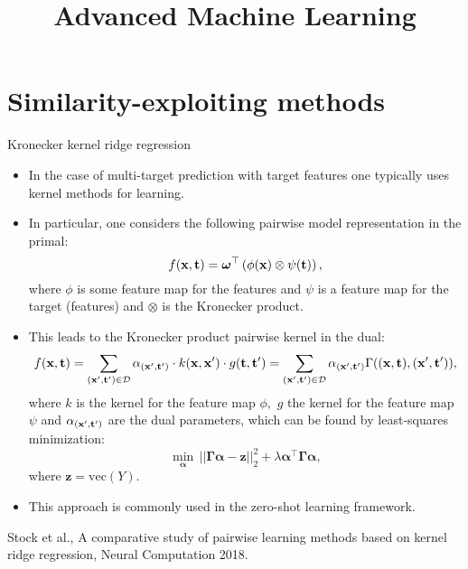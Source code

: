 \documentclass[11pt,compress,t,notes=noshow, xcolor=table]{beamer}
\title{Advanced Machine Learning}
\date{}
\newcommand{\tv}{\mathbf{t}}
\begin{document}



\sloppy

\section{Similarity-exploiting methods}


\begin{frame}{Kronecker kernel ridge regression}
	\footnotesize
	\begin{itemize}
%		
	\item In the case of multi-target prediction with target features one typically uses kernel methods for learning.
%		
	\item In particular, one considers the following pairwise model representation in the primal: 
		\begin{equation*}
			\label{eq:pairwise}
			f(\xv,\tv) = \bm\omega^\top \left(\phi(\xv) \otimes \psi(\tv) \right) ,
		\end{equation*}
%	
	where $\phi$ is some feature map for the features and $\psi$ is a feature map for the target (features) and $\otimes$ is the Kronecker product.
%
	\item This leads to the Kronecker product pairwise kernel in the dual:
%	
	\begin{eqnarray*} 
		f(\xv,\tv)= \sum_{(\xv',\tv') \in \D} \alpha_{(\xv',\tv')}  \cdot  k(\xv,\xv') \cdot g(\tv,\tv')  = \sum_{(\xv',\tv') \in \D} \alpha_{(\xv',\tv')} \Gamma((\xv,\tv),(\xv',\tv')),
	\end{eqnarray*}
%
	where $k$ is the kernel for the feature map $\phi,$  $g$ the kernel for the feature map $\psi$  and $\alpha_{(\xv',\tv')}$ are the dual parameters, which can be found by least-squares minimization:
%	 
	$$ \min_{\bm{\alpha}} \, ||\bm{\Gamma}\bm{\alpha} -\bm{z} ||^2_2 +\lambda\bm{\alpha }^\top \bm{\Gamma}\bm{\alpha}, $$
%	
	where $\bm{z} = \mathrm{vec}{(Y)}.$
%
%
	\item This approach is commonly used in the zero-shot learning framework.

%
\end{itemize}
%	
	{\tiny Stock et al., A comparative study of pairwise learning methods based on kernel ridge regression, Neural Computation 2018.}
%	
\end{frame}
\end{document}

